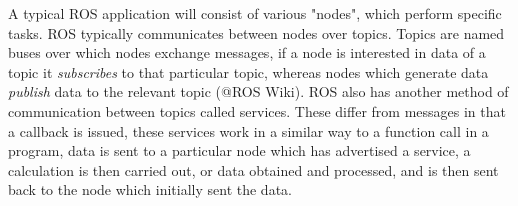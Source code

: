 A typical ROS application will consist of various "nodes", which perform specific tasks. ROS typically communicates between nodes over topics. Topics are named buses over which nodes exchange messages, if a node is interested in data of a topic it \emph{subscribes} to that particular topic, whereas nodes which generate data \emph{publish} data to the relevant topic (@ROS Wiki). ROS also has another method of communication between topics called services. These differ from messages in that a callback is issued, these services work in a similar way to a function call in a program, data is sent to a particular node which has advertised a service, a calculation is then carried out, or data obtained and processed, and is then sent back to the node which initially sent the data.


